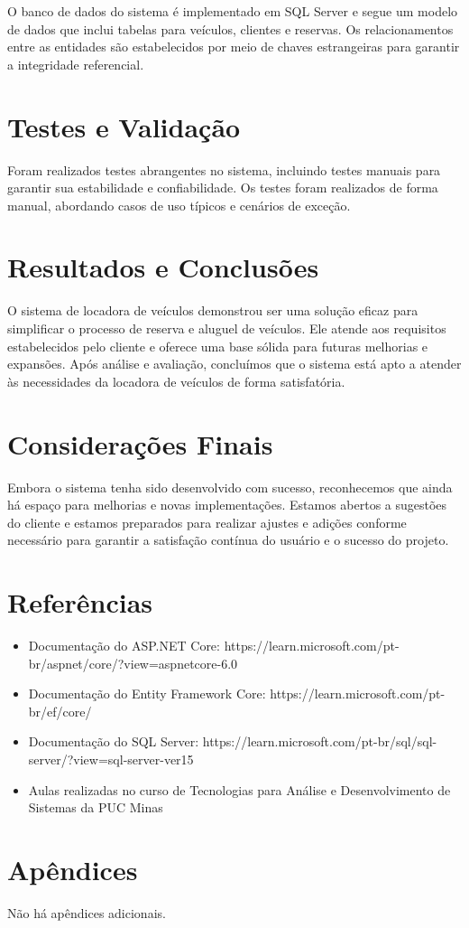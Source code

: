 \documentclass[12pt]{article}
\begin{document}
O banco de dados do sistema é implementado em SQL Server e segue um modelo de dados que inclui tabelas para veículos, clientes e reservas. Os relacionamentos entre as entidades são estabelecidos por meio de chaves estrangeiras para garantir a integridade referencial.

\section{Testes e Validação}

Foram realizados testes abrangentes no sistema, incluindo testes manuais para garantir sua estabilidade e confiabilidade. Os testes foram realizados de forma manual, abordando casos de uso típicos e cenários de exceção.

\section{Resultados e Conclusões}

O sistema de locadora de veículos demonstrou ser uma solução eficaz para simplificar o processo de reserva e aluguel de veículos. Ele atende aos requisitos estabelecidos pelo cliente e oferece uma base sólida para futuras melhorias e expansões. Após análise e avaliação, concluímos que o sistema está apto a atender às necessidades da locadora de veículos de forma satisfatória.

\section{Considerações Finais}

Embora o sistema tenha sido desenvolvido com sucesso, reconhecemos que ainda há espaço para melhorias e novas implementações. Estamos abertos a sugestões do cliente e estamos preparados para realizar ajustes e adições conforme necessário para garantir a satisfação contínua do usuário e o sucesso do projeto.

\section{Referências}

\begin{itemize}
    \item Documentação do ASP.NET Core: https://learn.microsoft.com/pt-br/aspnet/core/?view=aspnetcore-6.0
    \item Documentação do Entity Framework Core: https://learn.microsoft.com/pt-br/ef/core/
    \item Documentação do SQL Server: https://learn.microsoft.com/pt-br/sql/sql-server/?view=sql-server-ver15
    \item Aulas realizadas no curso de Tecnologias para Análise e Desenvolvimento de Sistemas da PUC Minas
\end{itemize}

\section{Apêndices}

Não há apêndices adicionais.
\end{document}
